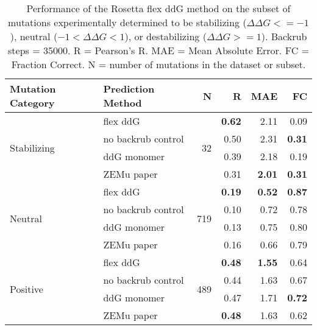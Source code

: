 \begin{table}
  \begin{tabular}{llrrrr}
\toprule
Mutation Category &   Prediction Method &    N &    R &  MAE &   FC \\
\midrule
 \multirow{ 4}{*}{Stabilizing} & flex ddG & \multirow{ 4}{*}{32} & \textbf{0.62} & 2.11 & 0.09  \\
 & no backrub control & & 0.50 & 2.31 & \textbf{0.31}  \\
 & ddG monomer & & 0.39 & 2.18 & 0.19  \\
 & ZEMu paper & & 0.31 & \textbf{2.01} & \textbf{0.31}  \\
\hline
 \multirow{ 4}{*}{Neutral} & flex ddG & \multirow{ 4}{*}{719} & \textbf{0.19} & \textbf{0.52} & \textbf{0.87}  \\
 & no backrub control & & 0.10 & 0.72 & 0.78  \\
 & ddG monomer & & 0.13 & 0.75 & 0.80  \\
 & ZEMu paper & & 0.16 & 0.66 & 0.79  \\
\hline
 \multirow{ 4}{*}{Positive} & flex ddG & \multirow{ 4}{*}{489} & \textbf{0.48} & \textbf{1.55} & 0.64  \\
 & no backrub control & & 0.44 & 1.63 & 0.67  \\
 & ddG monomer & & 0.47 & 1.71 & \textbf{0.72}  \\
 & ZEMu paper & & \textbf{0.48} & 1.63 & 0.62  \\
\bottomrule
\end{tabular}
  \caption[Flex ddG performance on stabilizing mutations]{
    Performance of the Rosetta flex ddG method on the subset of mutations experimentally determined to be stabilizing ($\Delta\Delta G <= -1$), neutral ($-1 < \Delta\Delta G < 1$), or destabilizing ($\Delta\Delta G >= 1$). Backrub steps = 35000. R = Pearson's R. MAE = Mean Absolute Error. FC = Fraction Correct. N = number of mutations in the dataset or subset.
  } \label{tab:table-stabilizing}
\end{table}
